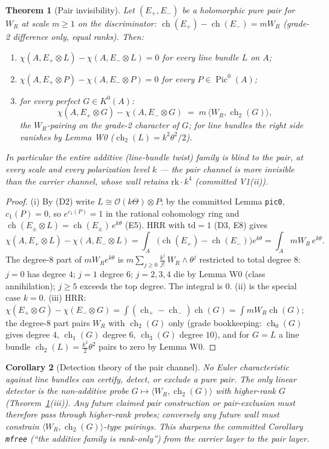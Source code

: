 \documentclass[11pt]{article}
\newtheorem{theorem}{Theorem}[section]
\newtheorem{corollary}[theorem]{Corollary}
\theoremstyle{definition}
\newcommand{\ch}{\operatorname{ch}}
\newcommand{\Pic}{\operatorname{Pic}}
\begin{document}
\begin{theorem}[Pair invisibility]\label{thm:w4}
Let $(E_+,E_-)$ be a holomorphic pure pair for $W_R$ at scale $m\ge 1$ on the
discriminator: $\ch(E_+)-\ch(E_-)=mW_R$ (grade-2 difference only, equal
ranks). Then:
\begin{enumerate}
\item[(i)] $\chi(A,E_+\otimes L)-\chi(A,E_-\otimes L)=0$ for \emph{every}
line bundle $L$ on $A$;
\item[(ii)] $\chi(A,E_+\otimes P)-\chi(A,E_-\otimes P)=0$ for every
$P\in\Pic^0(A)$;
\item[(iii)] for every perfect $G\in K^0(A)$:
\[
\chi(A,E_+\otimes G)-\chi(A,E_-\otimes G)\;=\;m\,\langle W_R,\ch_2(G)\rangle,
\]
the $W_R$-pairing on the grade-2 character of $G$; for line bundles the
right side vanishes by Lemma W0 ($\ch_2(L)=k^2\theta^2/2$).
\end{enumerate}
In particular the entire additive (line-bundle twist) family is blind to
the pair, at every scale and every polarization level $k$ --- the pair
channel is \emph{more} invisible than the carrier channel, whose wall retains
$\mathrm{rk}\cdot k^4$ (committed V1(ii)).
\end{theorem}

\begin{proof}
(i) By (D2) write $L\cong\mathcal O(k\Theta)\otimes P$; by the committed
Lemma \texttt{pic0}, $c_1(P)=0$, so $e^{c_1(P)}=1$ in the rational cohomology
ring and $\ch(E_\pm\otimes L)=\ch(E_\pm)\,e^{k\theta}$ (E5). HRR with
$\mathrm{td}=1$ (D3, E8) gives
\[
\chi(A,E_+\otimes L)-\chi(A,E_-\otimes L)
=\int_A\bigl(\ch(E_+)-\ch(E_-)\bigr)e^{k\theta}
=\int_A mW_R\, e^{k\theta}.
\]
The degree-$8$ part of $mW_Re^{k\theta}$ is
$m\sum_{j\ge 0}\frac{k^j}{j!}\,W_R\wedge\theta^{j}$ restricted to total
degree $8$: $j=0$ has degree $4$; $j=1$ degree $6$; $j=2,3,4$ die by Lemma W0
(class annihilation); $j\ge 5$ exceeds the top degree. The integral is $0$.
(ii) is the special case $k=0$. (iii) HRR:
$\chi(E_+\otimes G)-\chi(E_-\otimes G)
=\int(\ch_+-\ch_-)\ch(G)=\int mW_R\ch(G)$; the degree-$8$ part pairs $W_R$
with $\ch_2(G)$ only (grade bookkeeping: $\ch_0(G)$ gives degree $4$,
$\ch_1(G)$ degree $6$, $\ch_3(G)$ degree $10$), and for $G=L$ a line bundle
$\ch_2(L)=\tfrac{k^2}{2}\theta^2$ pairs to zero by Lemma W0.
\end{proof}

\begin{corollary}[Detection theory of the pair channel]\label{cor:detect}
No Euler characteristic against line bundles can certify, detect, or exclude
a pure pair. The only \emph{linear} detector is the non-additive probe
$G\mapsto\langle W_R,\ch_2(G)\rangle$ with higher-rank $G$
(Theorem~\ref{thm:w4}(iii)). Any future claimed pair construction or
pair-exclusion must therefore pass through higher-rank probes; conversely any
future wall must constrain $\langle W_R,\ch_2(G)\rangle$-type pairings.
This sharpens the committed Corollary \texttt{mfree} (``the additive family
is rank-only'') from the carrier layer to the pair layer.
\end{corollary}
\end{document}
